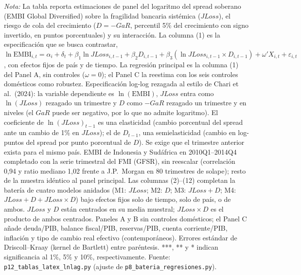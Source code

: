 \begin{landscape}
\begin{table}
\par\smallskip\parbox{\linewidth}{\scriptsize \textit{Nota:} La tabla reporta estimaciones de panel del logaritmo del spread soberano (EMBI Global Diversified) sobre la fragilidad bancaria sistémica ($JLoss$), el riesgo de cola del crecimiento ($D=-GaR$, percentil 5\% del crecimiento con signo invertido, en puntos porcentuales) y su interacción. La columna (1) es la especificación que se busca contrastar, $\ln\mathrm{EMBI}_{i,t}=\alpha_i+\delta_t+\beta_1\ln JLoss_{i,t-1}+\beta_2 D_{i,t-1}+\beta_3(\ln JLoss_{i,t-1}\times D_{i,t-1})+\omega'X_{i,t}+\varepsilon_{i,t}$, con efectos fijos de país y de tiempo. La regresión principal es la columna (1) del Panel A, sin controles ($\omega=0$); el Panel C la reestima con los seis controles domésticos como robustez. Especificación log-log rezagada al estilo de Chari et al.\ (2024): la variable dependiente es $\ln(\mathrm{EMBI})$, $JLoss$ entra como $\ln(JLoss)$ rezagado un trimestre y $D$ como $-GaR$ rezagado un trimestre y en niveles (el $GaR$ puede ser negativo, por lo que no admite logaritmo). El coeficiente de $\ln(JLoss)_{t-1}$ es una elasticidad (cambio porcentual del spread ante un cambio de 1\% en $JLoss$); el de $D_{t-1}$, una semielasticidad (cambio en log-puntos del spread por punto porcentual de $D$). Se exige que el trimestre anterior exista para el mismo país. EMBI de Indonesia y Sudáfrica en 2010Q1--2014Q4 completado con la serie trimestral del FMI (GFSR), sin reescalar (correlación 0,94 y ratio mediano 1,02 frente a J.P.\ Morgan en 80 trimestres de solape); resto de la muestra idéntico al panel principal. Las columnas (2)--(12) completan la batería de cuatro modelos anidados (M1: $JLoss$; M2: $D$; M3: $JLoss+D$; M4: $JLoss+D+JLoss\times D$) bajo efectos fijos solo de tiempo, solo de país, o de ambos. $JLoss$ y $D$ están centrados en su media muestral; $JLoss\times D$ es el producto de ambos centrados. Paneles A y B sin controles domésticos; el Panel C añade deuda/PIB, balance fiscal/PIB, reservas/PIB, cuenta corriente/PIB, inflación y tipo de cambio real efectivo (contemporáneos). Errores estándar de Driscoll--Kraay (kernel de Bartlett) entre paréntesis. ***, ** y * indican significancia al 1\%, 5\% y 10\%, respectivamente. Fuente: \texttt{p12\_tablas\_latex\_lnlag.py} (ajuste de \texttt{p8\_bateria\_regresiones.py}).}
\end{table}
\end{landscape}
